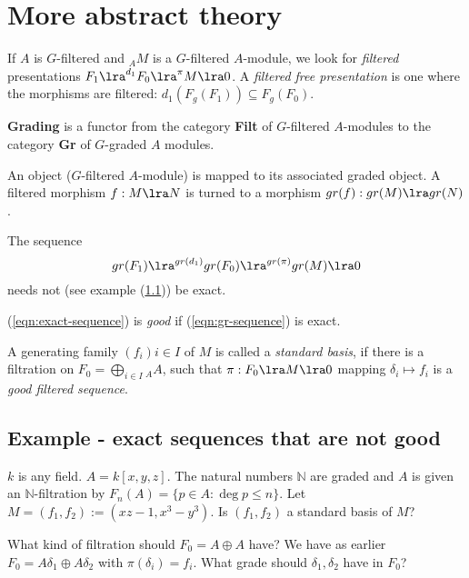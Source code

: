 \section{More abstract theory}
If $A$ is $G$-filtered and ${}_AM$ is a $G$-filtered $A$-module,
we look for \textit{filtered} presentations
$F_1 \lra^{d_1} F_0 \lra^{\pi} M \lra 0$.
A \textit{filtered free presentation} is one where
the morphisms are filtered:
$d_1(F_g(F_1)) \subseteq F_g(F_0)$.

\textbf{Grading} is a functor from the category \textbf{Filt}
of $G$-filtered $A$-modules to the category
\textbf{Gr} of $G$-graded $A$ modules.

An object ($G$-filtered $A$-module) is mapped
to its associated graded object.
A filtered morphism $f: M\lra N$ is turned to
a morphism $gr(f) : gr(M)\lra gr(N)$.

The sequence
\begin{equation}\label{eqn:gr-sequence}
gr(F_1) \lra^{gr(d_1)} gr(F_0) \lra^{gr(\pi)} gr(M) \lra 0
\end{equation}
needs not (see example (\ref{ssec:example-sequence-not-good}))
be exact.

\begin{Definition}
    (\ref{eqn:exact-sequence}) is \textit{good} if 
    (\ref{eqn:gr-sequence}) is exact.
\end{Definition}

\begin{Definition}
    A generating family $(f_i){i\in I}$ of $M$ is called
    a \textit{standard basis}, if there is a filtration
    on $F_0 = \bigoplus_{i\in I}{}_AA$, such that 
    $\pi: F_0 \lra M \lra 0$ mapping $\delta_i \mapsto f_i$
    is a \textit{good filtered sequence}.
    \end{Definition}

\subsection{Example - exact sequences that are not good}
\label{ssec:example-sequence-not-good}
$k$ is any field. $A = k[x,y,z]$. The natural numbers 
$\mathbb{N}$ are graded and $A$ is given an 
$\mathbb{N}$-filtration by 
$F_n(A) = \{p \in A : \deg p \leq n\}$.
Let $M=(f_1, f_2) := (xz-1, x^3-y^3)$. 
Is $(f_1, f_2)$ a standard basis of $M$?

What kind of filtration should $F_0 = A\oplus A$ have?
We have as earlier $F_0 = A\delta_1 \oplus A\delta_2$
with $\pi(\delta_i) = f_i$. What grade should 
$\delta_1, \delta_2$ have in $F_0$?

